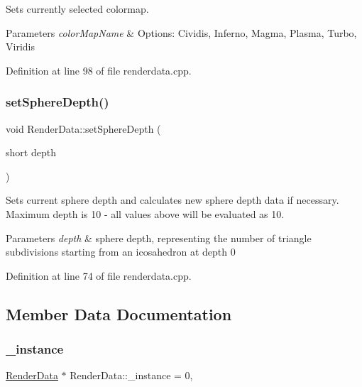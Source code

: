 Sets currently selected colormap. 
\begin{DoxyParams}{Parameters}
{\em color\+Map\+Name} & Options\+: Cividis, Inferno, Magma, Plasma, Turbo, Viridis \\
\hline
\end{DoxyParams}


Definition at line 98 of file renderdata.\+cpp.

\mbox{\label{class_render_data_a8d5f7285d29dc9ca0f93fcf2b5826283}} 
\subsubsection{\texorpdfstring{set\+Sphere\+Depth()}{setSphereDepth()}}
{\footnotesize\ttfamily void Render\+Data\+::set\+Sphere\+Depth (\begin{DoxyParamCaption}\item[{short}]{depth }\end{DoxyParamCaption})}

Sets current sphere depth and calculates new sphere depth data if necessary. Maximum depth is 10 -\/ all values above will be evaluated as 10. 
\begin{DoxyParams}{Parameters}
{\em depth} & sphere depth, representing the number of triangle subdivisions starting from an icosahedron at depth 0 \\
\hline
\end{DoxyParams}


Definition at line 74 of file renderdata.\+cpp.



\subsection{Member Data Documentation}
\mbox{\label{class_render_data_a133da67a805762c95284248a7ea1526c}} 
\subsubsection{\texorpdfstring{\+\_\+instance}{\_instance}}
{\footnotesize\ttfamily \hyperlink{class_render_data}{Render\+Data} $\ast$ Render\+Data\+::\+\_\+instance = 0\hspace{0.3cm}{\ttfamily [static]}, {\ttfamily [private]}}



